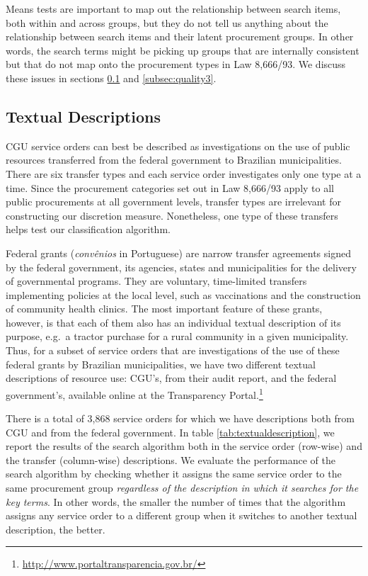\documentclass[11pt]{article}
\begin{document}
Means tests are important to map out the relationship between search items, both within and across groups, but they do not tell us anything about the relationship between search items and their latent procurement groups. In other words, the search terms might be picking up groups that are internally consistent but that do not map onto the procurement types in Law 8,666/93. We discuss these issues in sections \ref{subsec:quality2} and \ref{subsec:quality3}.

\subsection{Textual Descriptions}\label{subsec:quality2}

CGU service orders can best be described as investigations on the use of
public resources transferred from the federal government to Brazilian
municipalities. There are six transfer types and each service order
investigates only one type at a time. Since the procurement categories
set out in Law 8,666/93 apply to all public procurements at all
government levels, transfer types are irrelevant for constructing our
discretion measure. Nonetheless, one type of these transfers helps test
our classification algorithm.

Federal grants (\emph{convênios} in Portuguese) are narrow transfer
agreements signed by the federal government, its agencies, states and
municipalities for the delivery of governmental programs. They are
voluntary, time-limited transfers implementing policies at the local
level, such as vaccinations and the construction of community health
clinics. The most important feature of these grants, however, is that
each of them also has an individual textual description of its purpose,
e.g.~a tractor purchase for a rural community in a given municipality.
Thus, for a subset of service orders that are investigations of the use
of these federal grants by Brazilian municipalities, we have two
different textual descriptions of resource use: CGU's, from their audit
report, and the federal government's, available online at the
Transparency Portal.\footnote{\url{http://www.portaltransparencia.gov.br/}}



There is a total of 3,868 service orders for which we have descriptions both from CGU and from the federal government. In table \ref{tab:textualdescription}, we report the results of the search algorithm both in the service order (row-wise) and the transfer (column-wise) descriptions. We evaluate the performance of the search algorithm by checking whether it assigns the same service order to the same procurement group \emph{regardless of the description in which it searches for the key terms}. In other words, the smaller the number of times that the algorithm assigns any service order to a different group when it switches to another textual description, the better.
\end{document}
